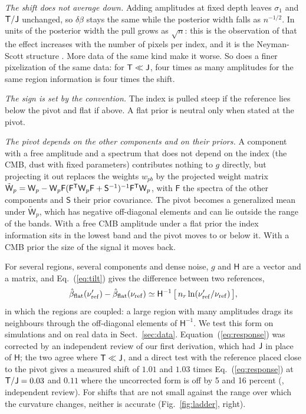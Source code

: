 \emph{The shift does not average down.} Adding amplitudes at fixed depth leaves $\sigma_1$ and
$\mathsf{T}/\mathsf{J}$ unchanged, so $\delta\beta$ stays the same while the posterior width falls as $n^{-1/2}$. In
units of the posterior width the pull grows as $\sqrt{n}$: this is the observation of
\citet{dunkley2009} that the effect increases with the number of pixels per index, and it is the
Neyman-Scott structure \citep{neyman1948}. More data of the same kind make it worse. So does a finer
pixelization of the same data: for $\mathsf{T} \ll \mathsf{J}$, four times as many amplitudes for the same region
information is four times the shift.

\emph{The sign is set by the convention.} The index is pulled steep if the reference lies below the
pivot and flat if above. A flat prior is neutral only when stated at the pivot.

\emph{The pivot depends on the other components and on their priors.} A component with a free
amplitude and a spectrum that does not depend on the index (the CMB, dust with fixed parameters)
contributes nothing to $g$ directly, but projecting it out replaces the weights $w_{pb}$ by the
projected weight matrix $\tilde{\mathsf{W}}_p = \mathsf{W}_p - \mathsf{W}_p \mathsf{F}
(\mathsf{F}^{\mathsf{T}}\mathsf{W}_p\mathsf{F} + \mathsf{S}^{-1})^{-1}\mathsf{F}^{\mathsf{T}}\mathsf{W}_p$, with $\mathsf{F}$ the spectra of the
other components and $\mathsf{S}$ their prior covariance. The pivot becomes a generalized mean under
$\tilde{\mathsf{W}}_p$, which has negative off-diagonal elements and can lie outside the range of the
bands. With a free CMB amplitude under a flat prior the index information sits in the lowest band and
the pivot moves to or below it. With a CMB prior the size of the signal it moves back.

For several regions, several components and dense noise, $g$ and $\mathsf{H}$ are a vector and a
matrix, and Eq.~(\ref{eq:tilt}) gives the difference between two references,
\begin{equation}
  \hat\beta_{\rm flat}(\nu_{\mathrm{ref}}') - \hat\beta_{\rm flat}(\nu_{\mathrm{ref}}) \simeq
  \mathsf{H}^{-1}\,\big[\,n_r \ln(\nu_{\mathrm{ref}}'/\nu_{\mathrm{ref}})\,\big] ,
  \label{eq:coupled}
\end{equation}
in which the regions are coupled: a large region with many amplitudes drags its neighbours through
the off-diagonal elements of $\mathsf{H}^{-1}$. We test this form on simulations and on real data in
Sect.~\ref{sec:data}. Equation~(\ref{eq:response}) was corrected by an independent review of our
first derivation, which had $\mathsf{J}$ in place of $\mathsf{H}$; the two agree where $\mathsf{T} \ll \mathsf{J}$, and a
direct test with the reference placed close to the pivot gives a measured shift of $1.01$ and $1.03$
times Eq.~(\ref{eq:response}) at $\mathsf{T}/\mathsf{J} = 0.03$ and $0.11$ where the uncorrected form is off by 5 and
16 percent (, independent review). For shifts that are not small against the range over
which the curvature changes, neither is accurate (Fig.~\ref{fig:ladder}, right).

